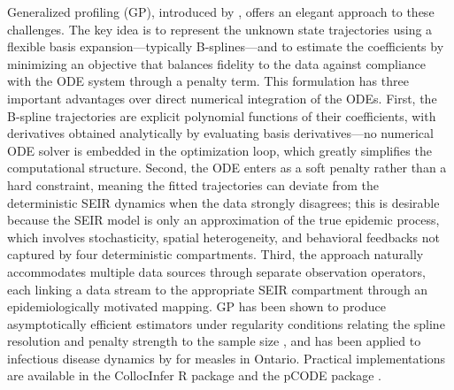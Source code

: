\documentclass[11pt]{article}
\begin{document}
Generalized profiling (GP), introduced by \citet{Ramsay2007}, offers an elegant approach to these challenges. The key idea is to represent the unknown state trajectories using a flexible basis expansion---typically B-splines---and to estimate the coefficients by minimizing an objective that balances fidelity to the data against compliance with the ODE system through a penalty term. This formulation has three important advantages over direct numerical integration of the ODEs. First, the B-spline trajectories are explicit polynomial functions of their coefficients, with derivatives obtained analytically by evaluating basis derivatives---no numerical ODE solver is embedded in the optimization loop, which greatly simplifies the computational structure. Second, the ODE enters as a soft penalty rather than a hard constraint, meaning the fitted trajectories can deviate from the deterministic SEIR dynamics when the data strongly disagrees; this is desirable because the SEIR model is only an approximation of the true epidemic process, which involves stochasticity, spatial heterogeneity, and behavioral feedbacks not captured by four deterministic compartments. Third, the approach naturally accommodates multiple data sources through separate observation operators, each linking a data stream to the appropriate SEIR compartment through an epidemiologically motivated mapping. GP has been shown to produce asymptotically efficient estimators under regularity conditions relating the spline resolution and penalty strength to the sample size \citep{QiZhao2010}, and has been applied to infectious disease dynamics by \citet{Hooker2011} for measles in Ontario. Practical implementations are available in the CollocInfer R package \citep{Hooker2016} and the pCODE package \citep{WangCao2023}.
\end{document}
